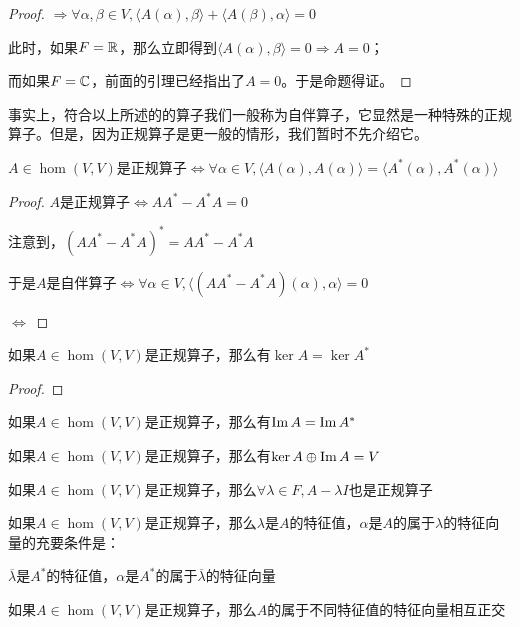 \documentclass[12pt, a4paper, oneside, UTF8]{ctexbook}
\begin{document}
\begin{para}{0}
\begin{proof}
						$\Rightarrow \forall \alpha ,\beta \in V,\langle A(\alpha ),\beta \rangle + \langle A(\beta ),\alpha \rangle =0$

						此时，如果$F=\mathbb{R}$，那么立即得到$\langle A(\alpha ),\beta \rangle =0 \Rightarrow A=0$；
						
						而如果$F=\mathbb{C}$，前面的引理已经指出了$A=0$。于是命题得证。
					\end{proof}
					事实上，符合以上所述的的算子我们一般称为自伴算子，它显然是一种特殊的正规算子。但是，因为正规算子是更一般的情形，我们暂时不先介绍它。
					\begin{proposition}
						$A \in \hom(V,V)$是正规算子$\Leftrightarrow \forall \alpha \in V,\langle A(\alpha ),A(\alpha )\rangle=\langle A^*(\alpha ),A^*(\alpha )\rangle$
					\end{proposition}
					\begin{proof}
						$A$是正规算子$\Leftrightarrow AA^*-A^*A=0$

						注意到，$(AA^*-A^*A)^*=AA^*-A^*A$

						于是$A$是自伴算子$\Leftrightarrow \forall \alpha \in V,\langle (AA^*-A^*A)(\alpha ),\alpha \rangle =0$

						$\Leftrightarrow $
					\end{proof}
				\point{}
					\begin{proposition}
						如果$A \in \hom(V,V)$是正规算子，那么有$\ker A = \ker A^*$
					\end{proposition}
					\begin{proof}
						
					\end{proof}
				\point{}
					\begin{proposition}
						如果$A \in \hom(V,V)$是正规算子，那么有$\operatorname{Im} A = \operatorname{Im} A^*$
					\end{proposition}
				\point{}
					\begin{proposition}
						如果$A \in \hom(V,V)$是正规算子，那么有$\ker A \oplus \operatorname{Im} A = V$
					\end{proposition}
				\point{}
					\begin{proposition}
						如果$A \in \hom(V,V)$是正规算子，那么$\forall \lambda \in F,A-\lambda I$也是正规算子
					\end{proposition}
				\point{}
					\begin{proposition}
						如果$A \in \hom(V,V)$是正规算子，那么$\lambda $是$A$的特征值，$\alpha $是$A$的属于$\lambda $的特征向量的充要条件是：

						$\overline{\lambda} $是$A^*$的特征值，$\alpha $是$A^*$的属于$\overline{\lambda }$的特征向量
					\end{proposition}
				\point{}
					\begin{proposition}
						如果$A \in \hom(V,V)$是正规算子，那么$A$的属于不同特征值的特征向量相互正交
					\end{proposition}
			\end{para}
\end{document}
